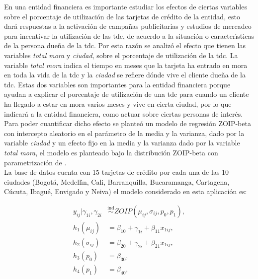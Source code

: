 En una entidad financiera es importante estudiar los efectos de ciertas variables sobre el porcentaje de utilizaci\'{o}n de las tarjetas de cr\'{e}dito de la entidad, esto dar\'{a} respuestas a la activaci\'{o}n de campa\~{n}as publicitarias y estudios de mercadeo para incentivar la utilizaci\'{o}n de las tdc, de acuerdo a la situaci\'{o}n o caracter\'{\i}sticas de la persona due\~{n}a de la tdc. Por esta raz\'{o}n se analiz\'{o} el efecto que tienen las variables \textsl{total mora} y \textsl{ciudad}, sobre el porcentaje de utilizaci\'{o}n de la tdc. La variable \textsl{total mora} indica el tiempo en meses que la tarjeta ha entrado en mora en toda la vida de la tdc y la \textsl{ciudad} se refiere d\'{o}nde vive el cliente due\~{n}a de la tdc. Estas dos variables son importantes para la entidad financiera porque ayudan a explicar el porcentaje de utilizaci\'{o}n de una tdc para cuando un cliente ha llegado a estar en mora varios meses y vive en cierta ciudad, por lo que indicar\'{a} a la entidad financiera, como actuar sobre ciertas personas de inter\'{e}s. Para poder cuantificar dicho efecto se plante\'{o} un modelo de regresi\'{o}n ZOIP-beta con intercepto aleatorio en el par\'{a}metro de la media y la varianza, dado por la variable \textsl{ciudad} y un efecto fijo en la media y la varianza dado por la variable \textsl{total mora}, el modelo es planteado bajo la distribuci\'{o}n ZOIP-beta con parametrizaci\'{o}n de \cite{Stasinopoulos2}.\\

La base de datos cuenta con 15 tarjetas de cr\'{e}dito por cada una de las 10 ciudades (Bogot\'{a}, Medell\'{\i}n, Cali, Barranquilla, Bucaramanga, Cartagena, C\'{u}cuta, Ibagu\'{e}, Envigado y Neiva) el modelo considerado en esta aplicaci\'{o}n es:

\begin{equation}
\begin{split}
y_{ij}| \gamma_{1i},\gamma_{2i} &\overset{\text{ind}}{\sim} ZOIP(\mu_{ij},\sigma_{ij},p_0, p_1),\\
h_1(\mu_{ij})&=\beta_{10}+\gamma_{1i}+\beta_{11} x_{1ij},\\
h_2(\sigma_{ij})&=\beta_{20}+\gamma_{2i}+\beta_{21} x_{1ij},\\
h_3(p_{0})&=\beta_{30},\\
h_4(p_{1})&=\beta_{40},
\end{split}
\label{A_eq_reg_mix}
\end{equation}

